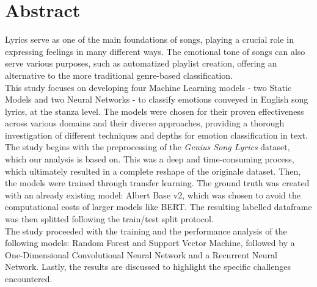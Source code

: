 \firstchapter
\chapter*{Abstract}
\label{ch:abstract}
Lyrics serve as one of the main foundations of songs, playing a crucial role in
expressing feelings in many different ways.
The emotional tone of songs can also serve various purposes, such as
automatized playlist creation,
offering an alternative to the more traditional genre-based classification.\\
This study focuses on developing four Machine Learning models - two Static Models
and two Neural Networks - to classify emotions conveyed in English song lyrics,
at the stanza level. The models were chosen for their proven effectiveness across various domains and
their diverse approaches, providing a thorough investigation of different
techniques and depths for emotion classification in text.\\
The study begins with the preprocessing of the \textit{Genius Song Lyrics} dataset, which our analysis is based on. 
This was a deep and time-consuming process, which ultimately resulted in a complete reshape of the originale dataset. 
Then, the models were trained through transfer learning. The ground truth was created with an already existing model: Albert Base v2, which was chosen to avoid the computational costs of larger models like BERT. 
The resulting labelled dataframe was then splitted following the train/test split protocol. \\
The study proceeded with the training and the performance analysis of the following models: Random Forest and Support Vector Machine, followed by a One-Dimensional Convolutional Neural Network and a Recurrent Neural Network. 
Lastly, the results are discussed to highlight the specific challenges encountered.
